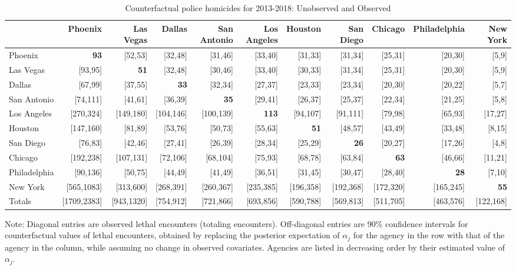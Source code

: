 \begin{table}[h!]\centering\scriptsize\tabcolsep=0.1cm\caption{Counterfactual police homicides for 2013-2018: Unobserved and Observed} \label{table:bootstrap_counterfactual_unobs_obs}\begin{tabular}{lrrrrrrrrrr}\hline \hline&Phoenix&Las Vegas&Dallas&San Antonio&Los Angeles&Houston&San Diego&Chicago&Philadelphia&New York\\
\hline
Phoenix&\textbf{93}&[52,53]&[32,48]&[31,46]&[33,40]&[31,33]&[31,34]&[25,31]&[20,30]&[5,9]\\
Las Vegas&[93,95]&\textbf{51}&[32,48]&[30,46]&[33,40]&[30,33]&[31,34]&[25,31]&[20,30]&[5,9]\\
Dallas&[67,99]&[37,55]&\textbf{33}&[32,34]&[27,37]&[23,33]&[23,34]&[20,30]&[20,22]&[5,7]\\
San Antonio&[74,111]&[41,61]&[36,39]&\textbf{35}&[29,41]&[26,37]&[25,37]&[22,34]&[21,25]&[5,8]\\
Los Angeles&[270,324]&[149,180]&[104,146]&[100,139]&\textbf{113}&[94,107]&[91,111]&[79,98]&[65,93]&[17,27]\\
Houston&[147,160]&[81,89]&[53,76]&[50,73]&[55,63]&\textbf{51}&[48,57]&[43,49]&[33,48]&[8,15]\\
San Diego&[76,83]&[42,46]&[27,41]&[26,39]&[28,34]&[25,29]&\textbf{26}&[20,27]&[17,26]&[4,8]\\
Chicago&[192,238]&[107,131]&[72,106]&[68,104]&[75,93]&[68,78]&[63,84]&\textbf{63}&[46,66]&[11,21]\\
Philadelphia&[90,136]&[50,75]&[44,49]&[41,49]&[36,51]&[31,45]&[30,47]&[28,40]&\textbf{28}&[7,10]\\
New York&[565,1083]&[313,600]&[268,391]&[260,367]&[235,385]&[196,358]&[192,368]&[172,320]&[165,245]&\textbf{55}\\
\hline
Totals&[1709,2383]&[943,1320]&[754,912]&[721,866]&[693,856]&[590,788]&[569,813]&[511,705]&[463,576]&[122,168]\\
\hline\end{tabular}\begin{center}\begin{minipage}{1.05\textwidth} %
 {\footnotesize {\schape Note}: Diagonal entries are observed lethal encounters (totaling \totalincidentsten{} encounters). Off-diagonal entries are 90\% confidence intervals for counterfactual values of lethal encounters, obtained by replacing the posterior expectation of $\alpha_j$ for the agency in the row with that of the agency in the column, while assuming no change in observed covariates. Agencies are listed in decreasing order by their estimated value of $\alpha_j$.} 
 \end{minipage} 
 \end{center} 
 \end{table} 
